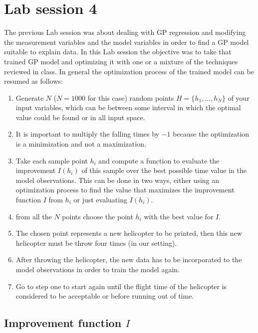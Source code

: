 \section{Lab session 4}

The previous Lab session was about dealing with GP regression and modifying the
measurement variables and the model variables in order to find a GP model
suitable to explain data. In this Lab session the objective was to take that
trained GP model and optimizing it with one or a mixture of the techniques
reviewed in class. In general the optimization process of the trained model can
be resumed as follows:

\begin{enumerate}
	\item Generate $N$ ($N = 1000$ for this case) random points $H = \{
	h_1,\ldots,h_N \}$ of your input variables, which can be between some interval
	in which the optimal value could be found or in all input space.

	\item It is important to multiply the falling times by $-1$ because the
	optimization is a minimization and not a maximization.

	\item Take each sample point $h_i$ and compute a function to evaluate the
	improvement $I(h_i)$ of this sample over the best possible time value in the
	model observations. This can be done in two ways, either using an optimization
	process to find the value that maximizes the improvement function $I$ from
	$h_i$ or just evaluating $I(h_i)$.

	\item from all the $N$ points choose the point $h_i$ with the best value for
	$I$.

	\item The chosen point represents a new helicopter to be printed, then this
	new helicopter must be throw four times (in our setting).

	\item After throwing the helicopter, the new data has to be incorporated to
	the model observations in order to train the model again.

	\item Go to step one to start again until the flight time of the helicopter is
	considered to be acceptable or before running out of time.
\end{enumerate}

\subsection{Improvement function $I$}

